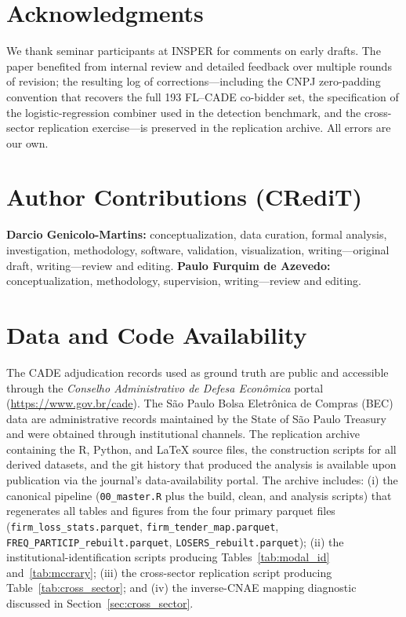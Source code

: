 
\section*{Acknowledgments}

We thank seminar participants at INSPER for comments on early
drafts. The paper benefited from internal review and detailed
feedback over multiple rounds of revision; the resulting log of
corrections---including the CNPJ zero-padding convention that
recovers the full 193 FL--CADE co-bidder set, the
specification of the logistic-regression combiner used in the
detection benchmark, and the cross-sector replication
exercise---is preserved in the replication archive. All errors
are our own.

\section*{Author Contributions (CRediT)}

\textbf{Darcio Genicolo-Martins:} conceptualization, data
curation, formal analysis, investigation, methodology, software,
validation, visualization, writing---original draft, writing---review
and editing.
\textbf{Paulo Furquim de Azevedo:} conceptualization, methodology,
supervision, writing---review and editing.

\section*{Data and Code Availability}

The CADE adjudication records used as ground truth are public
and accessible through the
\textit{Conselho Administrativo de Defesa Econ\^omica} portal
(\url{https://www.gov.br/cade}). The S\~ao Paulo Bolsa
Eletr\^onica de Compras (BEC) data are administrative records
maintained by the State of S\~ao Paulo Treasury and were
obtained through institutional channels. The replication
archive containing the R, Python, and \LaTeX{} source files,
the construction scripts for all derived datasets, and the git
history that produced the analysis is available upon publication
via the journal's data-availability portal. The archive
includes: (i) the canonical pipeline (\texttt{00\_master.R} plus
the build, clean, and analysis scripts) that regenerates all
tables and figures from the four primary parquet files
(\texttt{firm\_loss\_stats.parquet},
\texttt{firm\_tender\_map.parquet},
\texttt{FREQ\_PARTICIP\_rebuilt.parquet},
\texttt{LOSERS\_rebuilt.parquet}); (ii) the
institutional-identification scripts producing
Tables~\ref{tab:modal_id} and~\ref{tab:mccrary}; (iii) the
cross-sector replication script producing
Table~\ref{tab:cross_sector}; and (iv) the inverse-CNAE
mapping diagnostic discussed in
Section~\ref{sec:cross_sector}.

